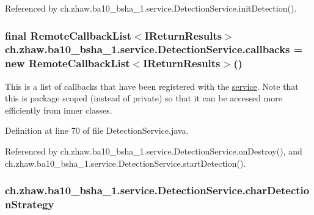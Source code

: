 Referenced by ch.zhaw.ba10\_\-bsha\_\-1.service.DetectionService.initDetection().\hypertarget{classch_1_1zhaw_1_1ba10__bsha__1_1_1service_1_1DetectionService_af1cfbca8177ea5c9c92d30b4f0f3052c}{
\subsubsection[{callbacks}]{\setlength{\rightskip}{0pt plus 5cm}final RemoteCallbackList$<$IReturnResults$>$ {\bf ch.zhaw.ba10\_\-bsha\_\-1.service.DetectionService.callbacks} = new RemoteCallbackList$<$IReturnResults$>$()}}
\label{classch_1_1zhaw_1_1ba10__bsha__1_1_1service_1_1DetectionService_af1cfbca8177ea5c9c92d30b4f0f3052c}
This is a list of callbacks that have been registered with the \hyperlink{namespacech_1_1zhaw_1_1ba10__bsha__1_1_1service}{service}. Note that this is package scoped (instead of private) so that it can be accessed more efficiently from inner classes. 

Definition at line 70 of file DetectionService.java.

Referenced by ch.zhaw.ba10\_\-bsha\_\-1.service.DetectionService.onDestroy(), and ch.zhaw.ba10\_\-bsha\_\-1.service.DetectionService.startDetection().\hypertarget{classch_1_1zhaw_1_1ba10__bsha__1_1_1service_1_1DetectionService_a27bece13d8cc4a8d488f104d078acfeb}{
\subsubsection[{charDetectionStrategy}]{ {\bf ch.zhaw.ba10\_\-bsha\_\-1.service.DetectionService.charDetectionStrategy}}}
\label{classch_1_1zhaw_1_1ba10__bsha__1_1_1service_1_1DetectionService_a27bece13d8cc4a8d488f104d078acfeb}


